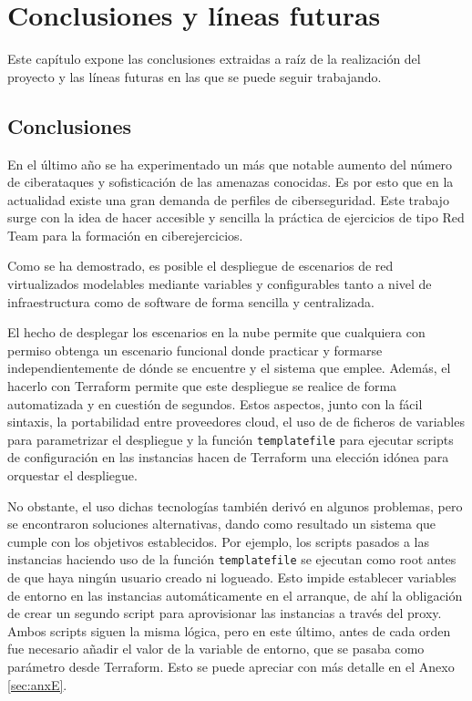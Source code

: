 \chapter{Conclusiones y líneas futuras} \label{ch:con}
  Este capítulo expone las conclusiones extraidas a raíz de la realización del proyecto y las líneas futuras en las que se puede seguir trabajando.

\section{Conclusiones} \label{sec:concs}
  En el último año se ha experimentado un más que notable aumento del número de ciberataques y sofisticación de las amenazas conocidas. Es por esto que en la actualidad existe una gran demanda de perfiles de ciberseguridad. Este trabajo surge con la idea de hacer accesible y sencilla la práctica de ejercicios de tipo Red Team para la formación en ciberejercicios. 

  Como se ha demostrado, es posible el despliegue de escenarios de red virtualizados modelables mediante variables y configurables tanto a nivel de infraestructura como de software de forma sencilla y centralizada.

  El hecho de desplegar los escenarios en la nube permite que cualquiera con permiso obtenga un escenario funcional donde practicar y formarse independientemente de dónde se encuentre y el sistema que emplee. Además, el hacerlo con Terraform permite que este despliegue se realice de forma automatizada y en cuestión de segundos. Estos aspectos, junto con la fácil sintaxis, la portabilidad entre proveedores cloud, el uso de de ficheros de variables para parametrizar el despliegue y la función \texttt{templatefile} para ejecutar scripts de configuración en las instancias hacen de Terraform una elección idónea para orquestar el despliegue.

  No obstante, el uso dichas tecnologías también derivó en algunos problemas, pero se encontraron soluciones alternativas, dando como resultado un sistema que cumple con los objetivos establecidos. Por ejemplo, los scripts pasados a las instancias haciendo uso de la función \texttt{templatefile} se ejecutan como root antes de que haya ningún usuario creado ni logueado. Esto impide establecer variables de entorno en las instancias automáticamente en el arranque, de ahí la obligación de crear un segundo script para aprovisionar las instancias a través del proxy. Ambos scripts siguen la misma lógica, pero en este último, antes de cada orden fue necesario añadir el valor de la variable de entorno, que se pasaba como parámetro desde Terraform. Esto se puede apreciar con más detalle en el Anexo \ref{sec:anxE}. 

